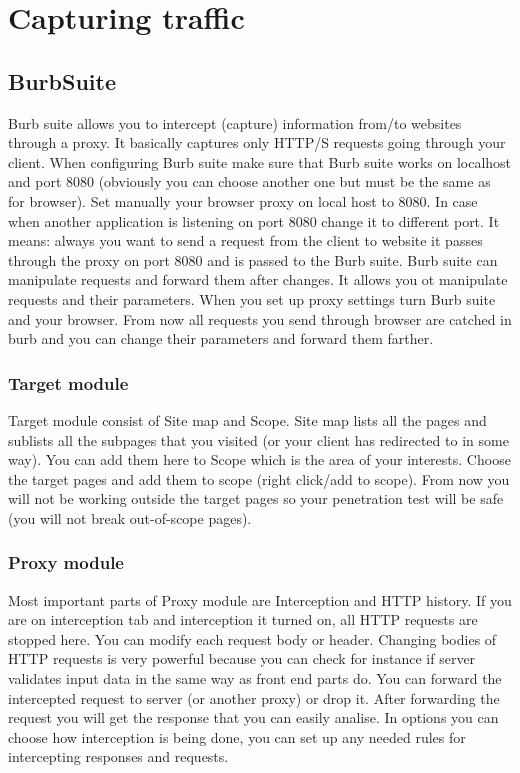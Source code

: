 \documentclass{article}[12pt]
\begin{document}
\section{Capturing traffic}
\label{sec:traffic}

\subsection{BurbSuite}
\label{subsec:burp}

Burb suite allows you to intercept (capture) information from/to websites through a proxy.
It basically captures only HTTP/S requests going through your client.
When configuring Burb suite make sure that Burb suite works on localhost and port 8080 (obviously you can choose another one but must be the same as for browser).
Set manually your browser proxy on local host to 8080.
In case when another application is listening on port 8080 change it to different port.
It means: always you want to send a request from the client to website it passes through the proxy on port 8080 and is passed to the Burb suite.
Burb suite can manipulate requests and forward them after changes.
It allows you ot manipulate requests and their parameters.
When you set up proxy settings turn Burb suite and your browser.
From now all requests you send through browser are catched in burb and you can change their parameters and forward them farther.

\subsubsection{Target module}
Target module consist of Site map and Scope.
Site map lists all the pages and sublists all the subpages that you visited (or your client has redirected to in some way).
You can add them here to Scope which is the area of your interests.
Choose the target pages and add them to scope (right click/add to scope).
From now you will not be working outside the target pages so your penetration test will be safe (you will not break out-of-scope pages).

\subsubsection{Proxy module}
Most important parts of Proxy module are Interception and HTTP history.
If you are on interception tab and interception it turned on, all HTTP requests are stopped here.
You can modify each request body or header.
Changing bodies of HTTP requests is very powerful because you can check for instance if server validates input data in the same way as front end parts do.
You can forward the intercepted request to server (or another proxy) or drop it.
After forwarding the request you will get the response that you can easily analise.
In options you can choose how interception is being done, you can set up any needed rules for intercepting responses and requests.
\end{document}
